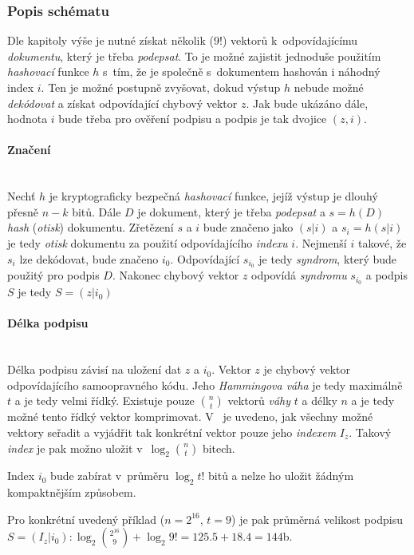 \documentclass[thesis=M,czech,hidelinks]{FITthesis}[2012/06/26]
\newcommand{\0}{{\textcolor[gray]{0.80}{0}}}
\begin{document}
\subsubsection{Popis schématu}

Dle kapitoly výše je nutné získat několik ($9!$) vektorů k~odpovídajícímu
\emph{dokumentu}, který je třeba \emph{podepsat}. To je možné zajistit jednoduše
použitím \emph{hashovací} funkce $h$ s~tím, že je společně s~dokumentem hashován
i náhodný index $i$. Ten je možné postupně zvyšovat, dokud výstup $h$ nebude
možné \emph{dekódovat} a získat odpovídající chybový vektor $z$. Jak bude
ukázáno dále, hodnota $i$ bude třeba pro ověření podpisu a podpis je tak dvojice
$(z,i)$.

\paragraph{Značení} \hfil \\
Nechť $h$ je kryptograficky bezpečná \emph{hashovací} funkce, jejíž výstup je
dlouhý přesně $n-k$ bitů. Dále $D$ je dokument, který je třeba \emph{podepsat} a
$ s = h\left(D\right)$ \emph{hash} (\emph{otisk}) dokumentu. Zřetězení $s$ a $i$
bude značeno jako $(s|i)$ a $s_i = h(s|i)$ je tedy \emph{otisk} dokumentu za
použití odpovídajícího \emph{indexu} $i$.  Nejmenší $i$ takové, že $s_i$ lze
dekódovat, bude značeno $i_0$. Odpovídající $s_{i_0}$ je tedy \emph{syndrom},
který bude použitý pro podpis $D$. Nakonec chybový vektor $z$ odpovídá
\emph{syndromu} $s_{i_0}$ a podpis $S$ je tedy $S = ( z | i_0 )$

\paragraph{Délka podpisu} \hfil \\
Délka podpisu závisí na uložení dat $z$ a $i_0$. Vektor $z$ je chybový vektor
odpovídajícího samoopravného kódu. Jeho \emph{Hammingova váha} je tedy maximálně
$t$ a je tedy velmi řídký. Existuje pouze $\binom{n}{t}$ vektorů \emph{váhy} $t$
a délky $n$ a je tedy možné tento řídký vektor komprimovat. V~\cite{Courtois} je
uvedeno, jak všechny možné vektory seřadit a vyjádřit tak konkrétní vektor pouze
jeho \emph{indexem} $I_z$. Takový \emph{index} je pak možno uložit
v~$\log_2{\binom{n}{t}}$ bitech.

Index $i_0$ bude zabírat v~průměru $\log_2{t!}$ bitů a nelze ho uložit žádným
kompaktnějším způsobem.

Pro konkrétní uvedený příklad ($n=2^{16}$, $t=9$) je pak průměrná velikost
podpisu $S = ( I_z | i_0 ): \log_2{\binom{2^{16}}{9}} + \log_2{9!} =
125.5 + 18.4 = 144$\;b.
\end{document}
